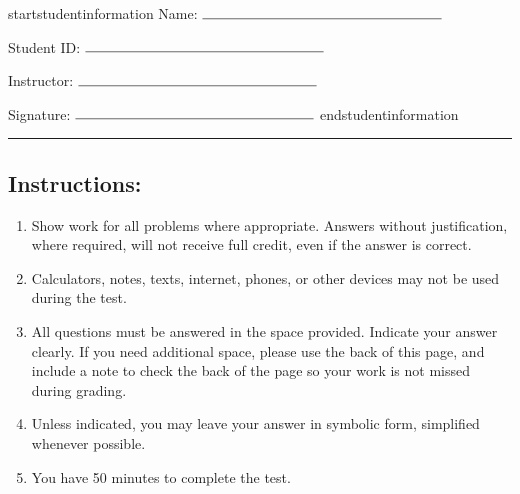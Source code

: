 


\thispagestyle{fancy}

startstudentinformation
\noindent Name: $\rule{6cm}{0.15mm}$

\vspace{.2cm}

\noindent Student ID: $\rule{6cm}{0.15mm}$

\vspace{.2cm}

\noindent Instructor: $\rule{6cm}{0.15mm}$

\vspace{.2cm}

\noindent Signature: $\rule{6cm}{0.15mm}$
endstudentinformation



\vspace{.4cm}


\vspace{.4cm}

\hrule

\subsection*{Instructions:} \begin{enumerate}[1.]
\item Show work for all problems where appropriate. Answers without justification, where required, will not receive full credit, even if the answer is correct.
\item Calculators, notes, texts, internet, phones, or other devices may not be used during the test.
\item All questions must be answered in the space provided. Indicate your answer clearly. If you need additional space, please use the back of this page, and include a note to check the back of the page so your work is not missed during grading.
\item Unless indicated, you may leave your answer in symbolic form, simplified whenever possible.
\item You have 50 minutes to complete the test.
\end{enumerate}


\newpage
